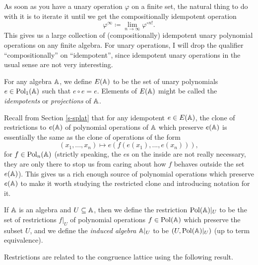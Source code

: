 \begin{appendices}
As soon as you have a unary operation $\varphi$ on a finite set, the natural thing to do with it is to iterate it until we get the compositionally idempotent operation
\[
\varphi^{\infty} \coloneqq \lim_{n\rightarrow \infty} \varphi^{\circ n!}.
\]
This gives us a large collection of (compositionally) idempotent unary polynomial operations on any finite algebra. For unary operations, I will drop the qualifier ``compositionally'' on ``idempotent'', since idempotent unary operations in the usual sense are not very interesting.

\begin{defn} For any algebra $\mathbb{A}$, we define $E(\mathbb{A})$ to be the set of unary polynomials $e \in \operatorname{Pol}_1(\mathbb{A})$ such that $e \circ e = e$. Elements of $E(\mathbb{A})$ might be called the \emph{idempotents} or \emph{projections} of $\mathbb{A}$.
\end{defn}

Recall from Section \ref{s-splat} that for any idempotent $e \in E(\mathbb{A})$, the clone of restrictions to $e(\mathbb{A})$ of polynomial operations of $\mathbb{A}$ which preserve $e(\mathbb{A})$ is essentially the same as the clone of operations of the form
\[
(x_1, ..., x_n) \mapsto e(f(e(x_1), ..., e(x_n))),
\]
for $f \in \operatorname{Pol}_n(\mathbb{A})$ (strictly speaking, the $e$s on the inside are not really necessary, they are only there to stop us from caring about how $f$ behaves outside the set $e(\mathbb{A})$). This gives us a rich enough source of polynomial operations which preserve $e(\mathbb{A})$ to make it worth studying the restricted clone and introducing notation for it.

\begin{defn} If $\mathbb{A}$ is an algebra and $U \subseteq \mathbb{A}$, then we define the restriction $\operatorname{Pol}(\mathbb{A})|_U$ to be the set of restrictions $f|_U$ of polynomial operations $f \in \operatorname{Pol}(\mathbb{A})$ which preserve the subset $U$, and we define the \emph{induced algebra} $\mathbb{A}|_U$ to be $(U, \operatorname{Pol}(\mathbb{A})|_U)$ (up to term equivalence).
\end{defn}

Restrictions are related to the congruence lattice using the following result.


\end{appendices}
